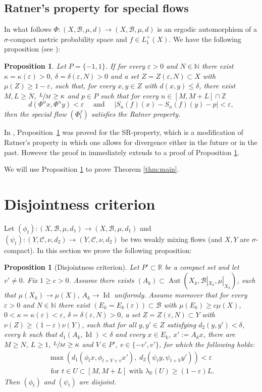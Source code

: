 \documentclass[JEP,XML,SOM,Unicode,NoEqCountersInSection]{cedram}
\let\mathcal\mathscr
\let\epsilon\varepsilon
\DeclareMathOperator{\Aut}{Aut}
\DeclareMathOperator{\Id}{Id}
\theoremstyle{definition}
\theoremstyle{plain}
\newtheorem{proposition}[definition]{Proposition}
\newcommand\NN{\mathbb{N}}
\newcommand\RR{\mathbb{R}}
\newcommand\ZZ{\mathbb{Z}}
\newcommand\cB{\mathcal{B}}
\newcommand\cC{\mathcal{C}}
\begin{document}
\subsection{Ratner's property for special flows}
In what follows $\Phi:(X,\cB,\mu,d)\to (X,\cB,\mu,d)$ is an ergodic automorphism of a $\sigma$-compact metric probability space and $f\in L_1^{+}(X)$. We have the following proposition (see \cite[Prop.\,4.1]{KK}):
\begin{proposition}\label{prop:specflows} Let $P=\{-1,1\}$. If for every $\epsilon>0$ and $N\in \NN$ there exist $\kappa=\kappa(\epsilon)>0$, $\delta=\delta(\epsilon,N)>0$ and a set $Z=Z(\epsilon,N)\subset X$ with $\mu(Z)\geq 1-\epsilon$, such that, for every $x,y\in Z$ with $d(x,y)\leq \delta$, there exist $M,L\geq N$, $\sfrac{L}{M}\geq \kappa$ and $p\in P$ such that for every $n\in [M,M+L]\cap \ZZ$
\[
d(\Phi^nx,\Phi^ny)< \epsilon\quad \text{ and }\quad |S_{n}(f) (x)-S_{n}(f)(y)-p|<\epsilon,
\]
then the special flow $(\Phi_t^f)$ satisfies the Ratner property.
\end{proposition}
In \cite{KK}, Proposition~\ref{prop:specflows} was proved for the SR-property, which is a modification of Ratner's property in which one allows for divergence either in the future or in the past. However the proof in \cite{KK} immediately extends to a proof of Proposition \ref{prop:specflows}.

We will use Proposition \ref{prop:specflows} to prove Theorem \ref{thm:main}.

\section{Disjointness criterion}\label{sec:disj}
Let $(\phi_t):(X,\cB,\mu,d_1)\to (X,\cB,\mu,d_1)$ and $(\psi_t):(Y,\cC,\nu,d_2)\to (Y,\cC,\nu,d_2)$ be two weakly mixing flows (and $X,Y$ are $\sigma$-compact). In this section we prove the following proposition:

\begin{proposition}[Disjointness criterion]\label{disjoint.flows}
Let $P'\subset \RR$ be a compact set and let $v'\neq 0$. Fix $1\geq c>0$. Assume there exists $(A_k)\subset \Aut(X_k,\cB|_{X_k},\mu|_{X_k})$, such that $\mu(X_k)\to \mu(X)$,
$A_k\to \Id$ uniformly.
Assume moreover that for every $\epsilon>0$ and $N\in \NN$
there exist $(E_k=E_k(\epsilon))\subset \cB$ with $\mu(E_k)\geq c\mu(X)$, $0<\kappa=\kappa(\epsilon)<\epsilon$, $\delta=\delta(\epsilon,N)>0$, a set $Z=Z(\epsilon,N)\subset Y$ with $\nu(Z)\geq (1-\epsilon)\nu(Y)$, such that for all $y,y'\in Z$ satisfying $d_2(y,y')<\delta$, every $k$ such that $d_1(A_k,\Id)<\delta$ and every $x\in E_k$, $x':=A_{k}x$, there are $M\geq N$, $L\geq 1$, $\sfrac{L}{M}\geq \kappa$ and $V\in P'$, $v\in\{-v',v'\}$,
for which the following holds:\vspace*{-5pt}
\begin{multline}\label{forw}
\max(d_1(\phi_tx,\phi_{t+V+v}x'),\;d_2(\psi_ty,\psi_{t+V}y'))<\epsilon\\ \text{ for } t\in U\subset [M,M+L]
\text{ with } \lambda_\RR(U)\geq (1-\epsilon)L.
\end{multline}
Then $(\phi_t)$ and $(\psi_t)$ are disjoint.
\end{proposition}
\end{document}
